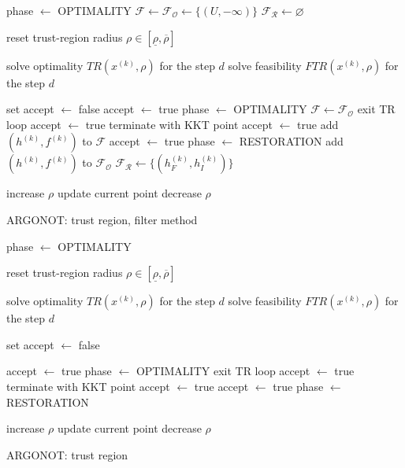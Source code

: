 \documentclass[11pt,twoside]{book}
\begin{document}
\begin{algorithm}[htbp]
\SetAlgoVlined
phase $\gets$ OPTIMALITY \;
$\mathcal{F} \gets \mathcal{F_O} \gets \{(U, -\infty)\}$ \;
$\mathcal{F_R} \gets \varnothing$ \;

 {
	reset trust-region radius $\rho \in [\underline{\rho}, \overline{\rho}]$ \;
	 {
		 {
			solve optimality $TR(x^{(k)}, \rho)$ for the step $d$ \;
		}{
			solve feasibility $FTR(x^{(k)}, \rho)$ for the step $d$ \;
		}
		
		\vspace{0.5cm}
		
		set accept $\gets$ false \;
		 {
			 {
				accept $\gets$ true \;
				phase $\gets$ OPTIMALITY \;
				$\mathcal{F} \gets \mathcal{F_O}$ \;
				exit TR loop \;
			}
			 {
				accept $\gets$ true \;
				terminate with KKT point \;
			}
			 {
				 {
					accept $\gets$ true \;
					add $(h^{(k)}, f^{(k)})$ to $\mathcal{F}$ \;
				}
				 {
					accept $\gets$ true \;
				}
			}
		}{
			phase $\gets$ RESTORATION \;
			add $(h^{(k)}, f^{(k)})$ to $\mathcal{F_O}$ \;
			$\mathcal{F_R} \gets \{(h_F^{(k)}, h_I^{(k)})\}$ \;
		}
		
		\vspace{0.5cm}
		
		 {
			increase $\rho$ \;
			update current point \;
		}{
			decrease $\rho$ \;
		}
	}
}
\caption{ARGONOT: trust region, filter method}
\end{algorithm}


\begin{algorithm}[htbp]
\SetAlgoVlined
phase $\gets$ OPTIMALITY \;

 {
	reset trust-region radius $\rho \in [\underline{\rho}, \overline{\rho}]$ \;
	 {
		 {
			solve optimality $TR(x^{(k)}, \rho)$ for the step $d$ \;
		}{
			solve feasibility $FTR(x^{(k)}, \rho)$ for the step $d$ \;
		}
		
		\vspace{0.5cm}
		
		set accept $\gets$ false \;
		
		 {
			 {
				accept $\gets$ true \;
				phase $\gets$ OPTIMALITY \;
				exit TR loop \;
			}
			 {
				accept $\gets$ true \;
				terminate with KKT point \;
			}
			 {
				 {
					accept $\gets$ true \;
				}
				 {
					accept $\gets$ true \;
				}
			}
		}{
			phase $\gets$ RESTORATION \;
		}
		
		\vspace{0.5cm}
		
		 {
			increase $\rho$ \;
			update current point \;
		}{
			decrease $\rho$ \;
		}
	}
}
\caption{ARGONOT: trust region}
\end{algorithm}
\end{document}
